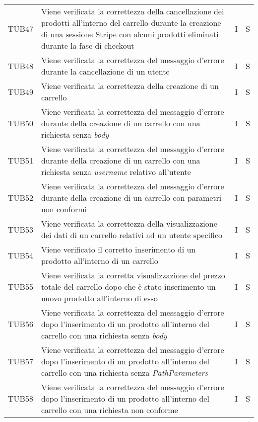 {\begin{longtable}{C{2cm} C{9.6cm} C{1.5cm} C{1cm}}
TUB47 & Viene verificata la correttezza della cancellazione dei prodotti all'interno del carrello durante la creazione di una sessione Stripe con alcuni prodotti eliminati durante la fase di checkout & I & S\\

TUB48 & Viene verificata la correttezza del messaggio d'errore durante la cancellazione di un utente & I & S\\

TUB49 & Viene verificata la correttezza della creazione di un carrello & I & S\\

TUB50 & Viene verificata la correttezza del messaggio d'errore durante della creazione di un carrello con una richiesta senza \textit{body} & I & S\\

TUB51 & Viene verificata la correttezza del messaggio d'errore durante della creazione di un carrello con una richiesta senza \textit{username} relativo all'utente & I & S\\

TUB52 & Viene verificata la correttezza del messaggio d'errore durante della creazione di un carrello con parametri non conformi & I & S\\

TUB53 & Viene verificata la correttezza della visualizzazione dei dati di un carrello relativi ad un utente specifico & I & S\\

TUB54 & Viene verificato il corretto inserimento di un prodotto all'interno di un carrello & I & S\\

TUB55 & Viene verificata la corretta visualizzazione del prezzo totale del carrello dopo che è stato inserimento un nuovo prodotto all'interno di esso & I & S\\

TUB56 & Viene verificata la correttezza del messaggio d'errore dopo l'inserimento di un prodotto all'interno del carrello con una richiesta senza \textit{body} & I & S\\

TUB57 & Viene verificata la correttezza del messaggio d'errore dopo l'inserimento di un prodotto all'interno del carrello con una richiesta senza \textit{PathParameters} & I & S\\

TUB58 & Viene verificata la correttezza del messaggio d'errore dopo l'inserimento di un prodotto all'interno del carrello con una richiesta non conforme & I & S\\


\end{longtable}}

